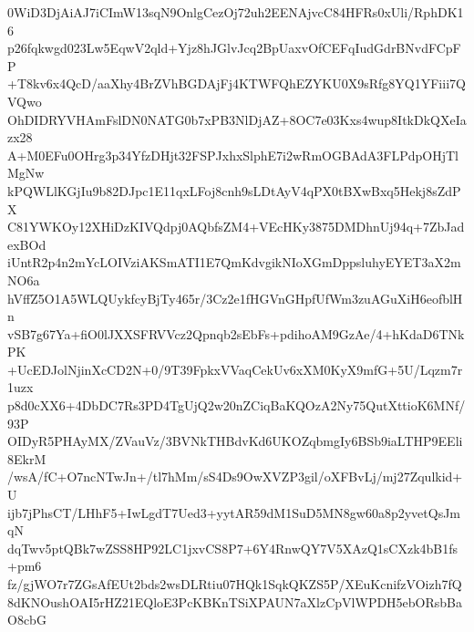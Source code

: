 0WiD3DjAiAJ7iCImW13sqN9OnlgCezOj72uh2EENAjvcC84HFRs0xUli/RphDK16
p26fqkwgd023Lw5EqwV2qld+Yjz8hJGlvJcq2BpUaxvOfCEFqIudGdrBNvdFCpFP
+T8kv6x4QcD/aaXhy4BrZVhBGDAjFj4KTWFQhEZYKU0X9sRfg8YQ1YFiii7QVQwo
OhDIDRYVHAmFslDN0NATG0b7xPB3NlDjAZ+8OC7e03Kxs4wup8ItkDkQXeIazx28
A+M0EFu0OHrg3p34YfzDHjt32FSPJxhxSlphE7i2wRmOGBAdA3FLPdpOHjTlMgNw
kPQWLlKGjIu9b82DJpc1E11qxLFoj8cnh9sLDtAyV4qPX0tBXwBxq5Hekj8sZdPX
C81YWKOy12XHiDzKIVQdpj0AQbfsZM4+VEcHKy3875DMDhnUj94q+7ZbJadexBOd
iUntR2p4n2mYcLOIVziAKSmATI1E7QmKdvgikNIoXGmDppsluhyEYET3aX2mNO6a
hVffZ5O1A5WLQUykfcyBjTy465r/3Cz2e1fHGVnGHpfUfWm3zuAGuXiH6eofblHn
vSB7g67Ya+fiO0lJXXSFRVVcz2Qpnqb2sEbFs+pdihoAM9GzAe/4+hKdaD6TNkPK
+UcEDJolNjinXcCD2N+0/9T39FpkxVVaqCekUv6xXM0KyX9mfG+5U/Lqzm7r1uzx
p8d0cXX6+4DbDC7Rs3PD4TgUjQ2w20nZCiqBaKQOzA2Ny75QutXttioK6MNf/93P
OIDyR5PHAyMX/ZVauVz/3BVNkTHBdvKd6UKOZqbmgIy6BSb9iaLTHP9EEli8EkrM
/wsA/fC+O7ncNTwJn+/tl7hMm/sS4Ds9OwXVZP3gil/oXFBvLj/mj27Zqulkid+U
ijb7jPhsCT/LHhF5+IwLgdT7Ued3+yytAR59dM1SuD5MN8gw60a8p2yvetQsJmqN
dqTwv5ptQBk7wZSS8HP92LC1jxvCS8P7+6Y4RnwQY7V5XAzQ1sCXzk4bB1fs+pm6
fz/gjWO7r7ZGsAfEUt2bds2wsDLRtiu07HQk1SqkQKZS5P/XEuKcnifzVOizh7fQ
8dKNOushOAI5rHZ21EQloE3PcKBKnTSiXPAUN7aXlzCpVlWPDH5ebORsbBaO8cbG
